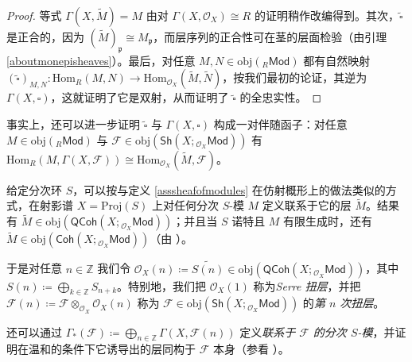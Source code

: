 \begin{proof}
等式 $\Gamma(X,\widetilde{M})=M$ 由对 $\Gamma(X,\mathcal{O}_X)\cong R$ 的证明稍作改编得到。其次，$\widetilde{\square}$ 是正合的，因为 $(\widetilde{M})_\mathfrak{p}\cong M_\mathfrak{p}$，而层序列的正合性可在茎的层面检验（由引理 \ref{aboutmonepisheaves}）。最后，对任意 $M, N\in\text{obj}({}_R\mathsf{Mod})$ 都有自然映射 $(\widetilde{\square})_{M,N}:\text{Hom}_R(M,N)\rightarrow\text{Hom}_{\mathcal{O}_X}(\widetilde{M},\widetilde{N})$，按我们最初的论证，其逆为 $\Gamma(X,\square)$，这就证明了它是双射，从而证明了 $\widetilde{\square}$ 的全忠实性。  
\end{proof}

事实上，还可以进一步证明 $\widetilde{\square}$ 与 $\Gamma(X,\square)$ 构成一对伴随函子：对任意 $M\in\text{obj}({}_R\mathsf{Mod})$ 与 $\mathcal{F}\in\text{obj}(\mathsf{Sh}(X;{}_{\mathcal{O}_X}\!\mathsf{Mod}))$ 有 $\text{Hom}_R(M,\Gamma(X,\mathcal{F}))\cong\text{Hom}_{\mathcal{O}_X}(\widetilde{M},\mathcal{F})$。

\begin{Rem}\label{asssheafofmodforproj}
给定分次环 $S$，可以按与定义 \ref{asssheafofmodules} 在仿射概形上的做法类似的方式，在射影谱 $X=\text{Proj}(S)$ 上对任何分次 $S$-模 $M$ 定义联系于它的层 $\widetilde{M}$。结果有 $\widetilde{M}\in\text{obj}(\mathsf{QCoh}(X;{}_{\mathcal{O}_X}\!\mathsf{Mod}))$；并且当 $S$ 诺特且 $M$ 有限生成时，还有 $\widetilde{M}\in\text{obj}(\mathsf{Coh}(X;{}_{\mathcal{O}_X}\!\mathsf{Mod}))$（由 \cite[命题 II.5.11]{[Har77]}）。

于是对任意 $n\in\mathbb{Z}$ 我们令 $\mathcal{O}_X(n)\coloneqq\widetilde{S(n)}\in\text{obj}(\mathsf{QCoh}(X;{}_{\mathcal{O}_X}\!\mathsf{Mod}))$，其中 $S(n)\coloneqq\bigoplus_{k\in\mathbb{Z}}S_{n+k}$。特别地，我们把 $\mathcal{O}_X(1)$ 称为\textit{Serre 扭层}，并把 $\mathcal{F}(n)\coloneqq\mathcal{F}\otimes_{\mathcal{O}_X}\mathcal{O}_X(n)$ 称为 $\mathcal{F}\in\text{obj}(\mathsf{Sh}(X;{}_{\mathcal{O}_X}\!\mathsf{Mod}))$ 的\textit{第 $n$ 次扭层}。

还可以通过 $\Gamma_*(\mathcal{F})\coloneqq\bigoplus_{n\in\mathbb{Z}}\Gamma(X,\mathcal{F}(n))$ 定义\textit{联系于 $\mathcal{F}$ 的分次 $S$-模}，并证明在温和的条件下它诱导出的层同构于 $\mathcal{F}$ 本身（参看 \cite[命题 II.5.15]{[Har77]}）。  
\end{Rem}

